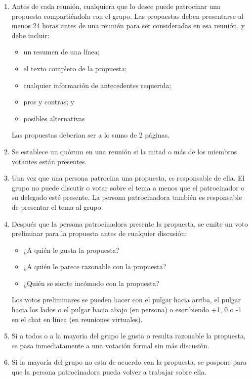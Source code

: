 \begin{enumerate}

\item
  Antes de cada reunión,
  cualquiera que lo desee puede patrocinar una propuesta compartiéndola con el grupo.
  Las propuestas deben presentarse al menos 24 horas antes de una reunión para ser consideradas en esa reunión,
  y debe incluir:
  \begin{itemize}
  \item un resumen de una línea;
  \item el texto completo de la propuesta;
  \item cualquier información de antecedentes requerida;
  \item pros y contras; y
  \item posibles alternativas
  \end{itemize}
  Las propuestas deberian ser a lo sumo de 2 páginas.

\item
  Se establece un quórum en una reunión si la mitad o más de los miembros votantes están presentes.

\item
  Una vez que una persona patrocina una propuesta,
  es responsable de ella.
  El grupo no puede discutir o votar sobre el tema a menos que el patrocinador o su delegado esté presente.
  La persona patrocinadora también es responsable de presentar el tema al grupo.

\item
  Después que la persona patrocinadora presente la propuesta,
  se emite un voto preliminar para la propuesta antes de cualquier discusión:
  \begin{itemize}
  \item ¿A quién le gusta la propuesta?
  \item ¿A quién le parece razonable con la propuesta?
  \item ¿Quién se siente incómodo con la propuesta?
  \end{itemize}
  Los votos preliminares se pueden hacer con el pulgar hacia arriba, el pulgar hacia los lados o el pulgar hacia abajo (en persona)
  o escribiendo +1, 0 o -1 en el chat en línea (en reuniones virtuales).

\item
  Si a todos o a la mayoria del grupo le gusta o resulta razonable la propuesta,
  se pasa inmediatamente a una votación formal sin más discusión.

\item
  Si la mayoría del grupo no esta de acuerdo con la propuesta,
  se pospone para que la persona patrocinadora pueda volver a trabajar sobre ella.


\end{enumerate}
